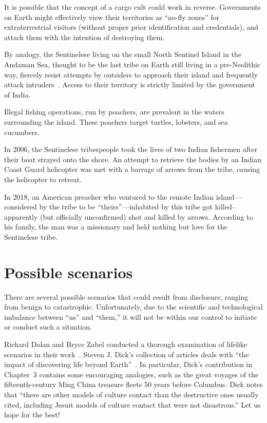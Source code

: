 It is possible that the concept of a cargo cult could work in reverse. Governments on Earth might effectively view their territories as
``no-fly zones''
for extraterrestrial visitors (without proper prior identification and credentials),
and attack them with the intention of destroying them.

By analogy, the Sentinelese living on the small North Sentinel Island in the Andaman Sea, thought to be the last tribe on Earth still living in a pre-Neolithic way,
fiercely resist attempts by outsiders to approach their island and frequently attack intruders~\cite{SentinelIsland2018Nov}.
Access to their territory is strictly limited by the government of India.

Illegal fishing operations, run by poachers, are prevalent in the waters surrounding the island. These poachers target turtles, lobsters, and sea cucumbers.

In 2006, the Sentinelese tribespeople took the lives of two Indian fishermen after their boat strayed onto the shore.
An attempt to retrieve the bodies by an Indian Coast Guard helicopter was met with a barrage of arrows from the tribe, causing the helicopter to retreat.

In 2018, an American preacher who ventured to the remote Indian island---considered by the tribe to be
``theirs''---inhabited by this tribe got killed--apparently
(but officially unconfirmed) shot and killed by arrows.
According to his family, the man was a missionary and held nothing but love for the Sentinelese tribe.

\section{Possible scenarios}

There are several possible scenarios that could result from disclosure, ranging from benign to catastrophic. Unfortunately, due to the scientific and technological imbalance between ``us'' and ``them,'' it will not be within our control to initiate or conduct such a situation.

Richard Dolan and Bryce Zabel conducted a thorough examination of lifelike scenarios in their work~\cite{DolanZabel2012May}. Steven J. Dick's collection of articles deals with ``the impact of discovering life beyond Earth''~\cite{Dick2015}. In particular, Dick's contribution in Chapter~3 contains some encouraging analogies, such as the great voyages of the fifteenth-century Ming China treasure fleets 50 years before Columbus. Dick notes that ``there are other models of culture contact than the destructive ones usually cited, including Jesuit models of culture contact that were not disastrous.'' Let us hope for the best!
